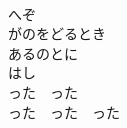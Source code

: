 \documentclass[10pt,b5j]{tarticle} %
\begin{document}
\begin{enumerate}
\begin{minipage}[c]{\blocksize}
        \vspace{\linespace}
        \item~\\
        へぞ\\
        がのをどるとき\\
        あるのとに\\
        はし\\
        った　った\\
        った　った　った
    
    \end{minipage}
\end{enumerate} %
\end{document}
